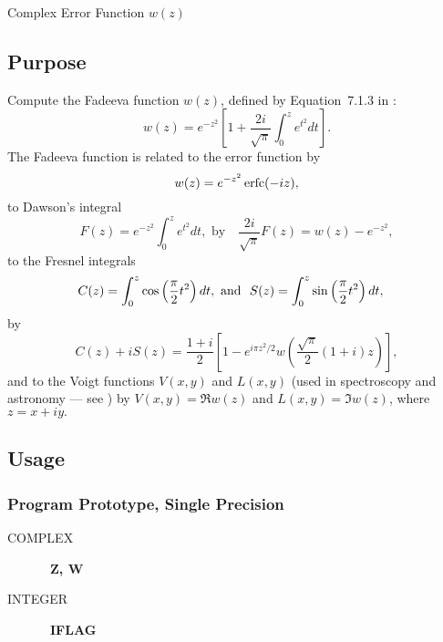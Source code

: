 \documentclass[twoside]{MATH77}
\begin{document}
 Complex Error Function $w(z)$


\subsection{Purpose}

Compute the Fadeeva function $w(z)$, defined by Equation~7.1.3 in \cite{ams55}:%
\begin{equation}\label{w_def}
w(z)=e^{-z^2}\left[ 1+\frac{2i}{\sqrt{\pi }}\int_0^ze^{t^2}dt\right] .
\end{equation}
The Fadeeva function is related to the error function by%
\begin{equation*}
w(z)=e^{-z^2}\erfc (-iz),
\end{equation*}
to Dawson's integral%
\begin{equation*}
F(z)=e^{-z^2}\int_0^ze^{t^2}dt,\text{ by}\quad \frac{2i}{\sqrt{\pi }}%
F(z)=w(z)-e^{-z^2},
\end{equation*}
to the Fresnel integrals%
\begin{equation*}
\hspace{-10pt}C(z)=\int_0^z\cos \left( \frac \pi 2t^2\right) dt,\ \text{and}\ \
S(z)=\int_0^z\sin \left( \frac \pi 2t^2\right) dt,
\end{equation*}
by
\begin{equation*}
C(z)+iS(z)=\frac{1+i}2\left[ 1- e^{i \pi z^2 / 2}w\left( \frac{\sqrt{\pi
}}2(1+i)z\right) \right] ,
\end{equation*}
and to the Voigt functions $V(x,y)$ and $L(x,y)$ (used in spectroscopy and
astronomy --- see \cite{Penner:1959:QMS}) by $V(x,y)=\Re w(z)$ and
$L(x,y)=\Im w(z)$, where $z=x+iy.$

\subsection{Usage}

\subsubsection{Program Prototype, Single Precision}

\begin{description}
\item[COMPLEX]  \ {\bf Z, W}

\item[INTEGER]  \ {\bf IFLAG}
\end{description}
\end{document}
